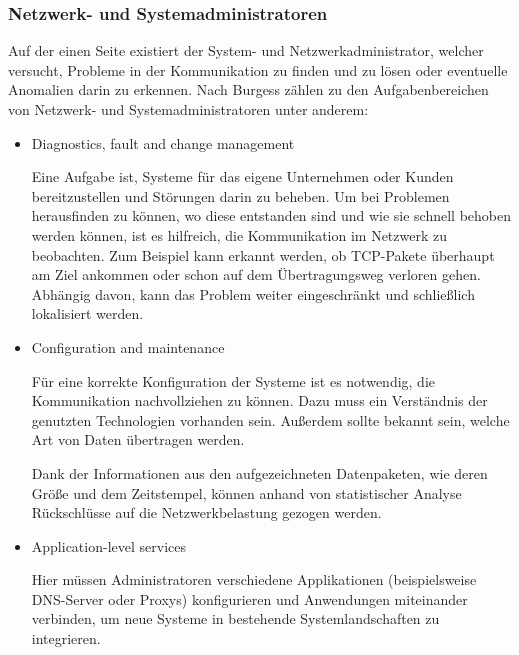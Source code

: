     \subsubsection{Netzwerk- und Systemadministratoren} \label{NetzwerkUndSystemadmin}
    Auf der einen Seite existiert der System- und Netzwerkadministrator, welcher versucht, Probleme in der Kommunikation zu finden und zu lösen oder eventuelle Anomalien darin zu erkennen.
    Nach Burgess \cite{burgess2004principles} zählen zu den Aufgabenbereichen von Netzwerk- und Systemadministratoren unter anderem:
    \begin{itemize}
        \item \glqq Diagnostics, fault and change management\grqq{}
        
        Eine Aufgabe ist, Systeme für das eigene Unternehmen oder Kunden bereitzustellen und Störungen darin zu beheben. Um bei Problemen herausfinden zu können, wo diese entstanden sind und wie sie schnell behoben werden können, ist es hilfreich, die Kommunikation im Netzwerk zu beobachten. Zum Beispiel kann erkannt werden, ob \ac{TCP}-Pakete überhaupt am Ziel ankommen oder schon auf dem Übertragungsweg verloren gehen. Abhängig davon, kann das Problem weiter eingeschränkt und schließlich lokalisiert werden.
        
        \item \glqq Configuration and maintenance\grqq{}
        
        Für eine korrekte Konfiguration der Systeme ist es notwendig, die Kommunikation nachvollziehen zu können. Dazu muss ein Verständnis der genutzten Technologien vorhanden sein. Außerdem sollte bekannt sein, welche Art von Daten übertragen werden.
        
        Dank der Informationen aus den aufgezeichneten Datenpaketen, wie deren Größe und dem Zeitstempel, können anhand von statistischer Analyse Rückschlüsse auf die Netzwerkbelastung gezogen werden.
        
        \item \glqq Application-level services\grqq{}
        
        Hier müssen Administratoren verschiedene Applikationen (beispielsweise \\ \ac{DNS}-Server oder Proxys) konfigurieren und Anwendungen miteinander verbinden, um neue Systeme in bestehende Systemlandschaften zu integrieren.
        
    \end{itemize}

